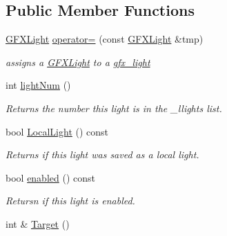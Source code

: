 \subsection*{Public Member Functions}
\begin{DoxyCompactItemize}
\item 
\hyperlink{classGFXLight}{G\+F\+X\+Light} \hyperlink{classgfx__light_a3266f2d2d33523590d891dc0ea4f7d82}{operator=} (const \hyperlink{classGFXLight}{G\+F\+X\+Light} \&tmp)\hypertarget{classgfx__light_a3266f2d2d33523590d891dc0ea4f7d82}{}\label{classgfx__light_a3266f2d2d33523590d891dc0ea4f7d82}

\begin{DoxyCompactList}\small\item\em assigns a \hyperlink{classGFXLight}{G\+F\+X\+Light} to a \hyperlink{classgfx__light}{gfx\+\_\+light} \end{DoxyCompactList}\item 
int \hyperlink{classgfx__light_a67a2d7edb4c0704edbe3bac49fa1c0a8}{light\+Num} ()\hypertarget{classgfx__light_a67a2d7edb4c0704edbe3bac49fa1c0a8}{}\label{classgfx__light_a67a2d7edb4c0704edbe3bac49fa1c0a8}

\begin{DoxyCompactList}\small\item\em Returns the number this light is in the \+\_\+llights list. \end{DoxyCompactList}\item 
bool \hyperlink{classgfx__light_a3523fbb38f63574f301d9297d509afb6}{Local\+Light} () const \hypertarget{classgfx__light_a3523fbb38f63574f301d9297d509afb6}{}\label{classgfx__light_a3523fbb38f63574f301d9297d509afb6}

\begin{DoxyCompactList}\small\item\em Returns if this light was saved as a local light. \end{DoxyCompactList}\item 
bool \hyperlink{classgfx__light_a0fff10aa6915be6907600782738914c8}{enabled} () const \hypertarget{classgfx__light_a0fff10aa6915be6907600782738914c8}{}\label{classgfx__light_a0fff10aa6915be6907600782738914c8}

\begin{DoxyCompactList}\small\item\em Retursn if this light is enabled. \end{DoxyCompactList}\item 
int \& \hyperlink{classgfx__light_ab401bb123118d1f2197daf42dafc4a88}{Target} ()\hypertarget{classgfx__light_ab401bb123118d1f2197daf42dafc4a88}{}\label{classgfx__light_ab401bb123118d1f2197daf42dafc4a88}


\end{DoxyCompactItemize}
